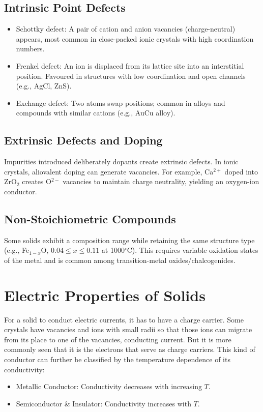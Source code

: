 \subsection{Intrinsic Point Defects}
%
\begin{itemize}
    \item Schottky defect: A pair of cation and anion vacancies (charge-neutral) appears, 
    		most common in close-packed ionic crystals with high coordination numbers.
    \item Frenkel defect: An ion is displaced from its lattice site into an interstitial position. 
    		Favoured in structures with low coordination and open channels (e.g., AgCl, ZnS).
    \item Exchange defect: Two atoms swap positions; common in alloys and compounds with similar cations 
    		(e.g., AuCu alloy).
\end{itemize}

\subsection{Extrinsic Defects and Doping}

Impurities introduced deliberately dopants create extrinsic defects.
In ionic crystals, aliovalent doping can generate vacancies. For example, Ca$^{2+}$ doped into ZrO$_2$ creates O$^{2-}$ vacancies to maintain charge neutrality, yielding an oxygen-ion conductor.

\subsection{Non-Stoichiometric Compounds}

Some solids exhibit a composition range while retaining the same structure type (e.g., Fe$_{1-x}$O, $0.04\le x\le 0.11$ at 1000$^\circ$C). This requires variable oxidation states of the metal and is common among transition-metal oxides/chalcogenides.

%
\section{Electric Properties of Solids}
%
For a solid to conduct electric currents, it has to have a charge carrier. 
Some crystals have vacancies and ions with small radii so that those ions can migrate from its place to one of the vacancies, conducting current.
But it is more commonly seen that it is the electrons that serve as charge carriers.
This kind of conductor can further be classified by the temperature dependence of its conductivity:
\begin{itemize}
    \item Metallic Conductor: Conductivity decreases with increasing $T$.
    \item Semiconductor \& Insulator: Conductivity increases with $T$.
\end{itemize}
%

